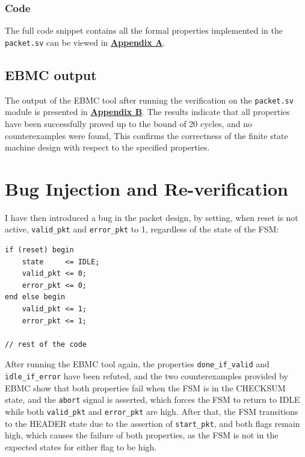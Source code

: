 \documentclass{article}
\begin{document}
\subsubsection{Code}

The full code snippet contains all the formal properties implemented in the \texttt{packet.sv} can be viewed in \hyperref[sec:appa]{\textbf{Appendix A}}.

\subsection{EBMC output}

The output of the EBMC tool after running the verification on the \texttt{packet.sv} module is presented in \hyperref[sec:appb]{\textbf{Appendix B}}. The results indicate that all properties have been successfully proved up to the bound of 20 cycles, and no counterexamples were found, This confirms the correctness of the finite state machine design with respect to the specified properties.


\section{Bug Injection and Re-verification}

I have then introduced a bug in the packet design, by setting, when reset is not active, \texttt{valid\_pkt} and \texttt{error\_pkt} to 1, regardless of the state of the FSM: 

    \begin{verbatim}
if (reset) begin
    state     <= IDLE;
    valid_pkt <= 0;
    error_pkt <= 0;
end else begin
    valid_pkt <= 1;
    error_pkt <= 1;

// rest of the code 
    \end{verbatim}

After running the EBMC tool again, the properties \texttt{done\_if\_valid} and \texttt{idle\_if\_error} have been refuted, and the two counterexamples provided by EBMC show that both properties fail when the FSM is in the CHECKSUM state, and the \texttt{abort} signal is asserted, which forces the FSM to return to IDLE while both \texttt{valid\_pkt} and \texttt{error\_pkt} are high. After that, the FSM transitions to the HEADER state due to the assertion of \texttt{start\_pkt}, and both flags remain high, which causes the failure of both properties, as the FSM is not in the expected states for either flag to be high.
\end{document}
